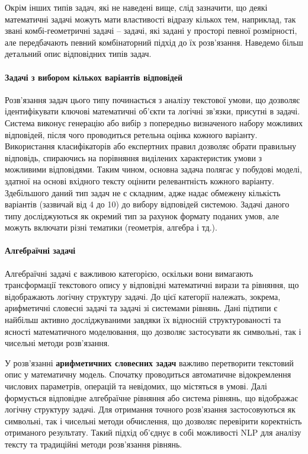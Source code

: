 Окрім інших типів задач, які не наведені вище, слід зазначити, що деякі математичні задачі можуть мати властивості відразу кількох тем, наприклад, так звані комбі-геометричні задачі -- задачі, які задані у просторі певної розмірності, але передбачають певний комбінаторний підхід до їх розв'язання. Наведемо більш детальний опис відповідних типів задач.

\paragraph{Задачі з вибором кількох варіантів відповідей}
Розв'язання задач цього типу починається з аналізу текстової умови, що дозволяє ідентифікувати ключові математичні об'єкти та логічні зв'язки, присутні в задачі. Система виконує генерацію або вибір з попередньо визначеного набору можливих відповідей, після чого проводиться ретельна оцінка кожного варіанту. Використання класифікаторів або експертних правил дозволяє обрати правильну відповідь, спираючись на порівняння виділених характеристик умови з можливими відповідями. Таким чином, основна задача полягає у побудові моделі, здатної на основі вхідного тексту оцінити релевантність кожного варіанту. Здебільшого даний тип задач не є складним, адже надає обмежену кількість варіантів (зазвичай від 4 до 10) до вибору відповідей системою.  Задачі даного типу досліджуються як окремий тип за рахунок формату поданих умов, але можуть включати різні тематики (геометрія, алгебра і тд.).

\paragraph{Алгебраїчні задачі}
Алгебраїчні задачі є важливою категорією, оскільки вони вимагають трансформації текстового опису у відповідні математичні вирази та рівняння, що відображають логічну структуру задачі. До цієї категорії належать, зокрема, арифметичні словесні задачі та задачі зі системами рівнянь. Дані підтипи є найбільш активно досліджуваними завдяки їх відносній структурованості та ясності математичного моделювання, що дозволяє застосувати як символьні, так і чисельні методи розв'язання.

У розв'язанні \textbf{арифметичних словесних задач} важливо перетворити текстовий опис у математичну модель. Спочатку проводиться автоматичне відокремлення числових параметрів, операцій та невідомих, що містяться в умові. Далі формується відповідне алгебраїчне рівняння або система рівнянь, що відображає логічну структуру задачі. Для отримання точного розв'язання застосовуються як символьні, так і чисельні методи обчислення, що дозволяє перевірити коректність отриманого результату. Такий підхід об'єднує в собі можливості NLP для аналізу тексту та традиційні методи розв'язання рівнянь.

